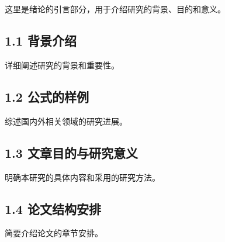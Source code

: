 \documentclass[12pt, a4paper]{article}
\begin{document}
\setcounter{secnumdepth}{0} %
\tableofcontents %
\thispagestyle{empty} %
\cleardoublepage %

\pagestyle{fancy}
\fancyhf{}
\renewcommand{\headrulewidth}{0pt}
\renewcommand{\footrulewidth}{0pt}
\thispagestyle{fancy} %

\section{\songti{}}
\renewcommand{\thesection}{}
\begin{spacing}{1.25} %
\songti{}
这里是绪论的引言部分，用于介绍研究的背景、目的和意义。\cite{HLKX202511017}

\subsection{\songti{}1.1 背景介绍}
\renewcommand{\thesubsection}{}
\songti{}
详细阐述研究的背景和重要性。

\subsection{\songti{}1.2 公式的样例}
\renewcommand{\thesubsection}{}
\songti{}
综述国内外相关领域的研究进展。

\subsection{\songti{}1.3 文章目的与研究意义}
\renewcommand{\thesubsection}{}
\songti{}
明确本研究的具体内容和采用的研究方法。

\subsection{\songti{}1.4 论文结构安排}
\renewcommand{\thesubsection}{}
\songti{}
简要介绍论文的章节安排。
\end{spacing}
\end{document}
